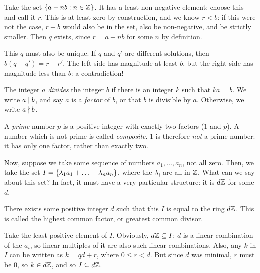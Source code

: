 \documentclass{article}
\begin{document}
\begin{prf}
	Take the set $\left\lbrace a - nb : n \in \mathbb{Z} \right\rbrace$. It has a least non-negative element: choose this and call it $r$. This is at least zero by construction, and we know $r < b$: if this were not the case, $r - b$ would also be in the set, also be non-negative, and be strictly smaller. Then $q$ exists, since $r = a - nb$ for some $n$ by definition.

	This $q$ must also be unique. If $q$ and $q'$ are different solutions, then $b(q - q') = r - r'$. The left side has magnitude at least $b$, but the right side has magnitude less than $b$: a contradiction!
\end{prf}

\begin{definition}
	\label{factor-prime-definition}
	The integer $a$ \textit{divides} the integer $b$ if there is an integer $k$ such that $ka = b$.
	We write $a \mid b$, and say $a$ is a \textit{factor} of $b$, or that $b$ is divisible by $a$.
	Otherwise, we write $a \nmid b$.

	A \textit{prime} number $p$ is a positive integer with exactly two factors ($1$ and $p$).
	A number which is not prime is called \textit{composite}.
	1 is therefore \textit{not} a prime number: it has only one factor, rather than exactly two.
\end{definition}

Now, suppose we take some sequence of numbers $a_1, \ldots, a_n$, not all zero. Then, we take the set $I = \left\lbrace \lambda_1 a_1 +  \ldots + \lambda_n a_n \right\rbrace$, where the $\lambda_i$ are all in $\mathbb{Z}$. What can we say about this set? In fact, it must have a very particular structure: it is $d\mathbb{Z}$ for some $d$.

\begin{proposition}
	\label{highest-common-factor-theorem}
	There exists some positive integer $d$ such that this $I$ is equal to the ring $d\mathbb{Z}$. This is called the highest common factor, or greatest common divisor.
\end{proposition}

\begin{prf}
	Take the least positive element of $I$.
	Obviously, $d\mathbb{Z} \subseteq I$: $d$ is a linear combination of the $a_i$, so linear multiples of it are also such linear combinations.
	Also, any $k$ in $I$ can be written as $k = qd + r$, where $0 \leq r < d$.
	But since $d$ was minimal, $r$ must be 0, so $k \in d\mathbb{Z}$, and so $I \subseteq d\mathbb{Z}$.
\end{prf}
\end{document}
